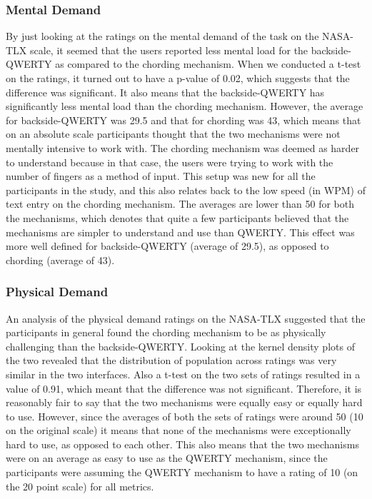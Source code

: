 \subsubsection{Mental Demand}

By just looking at the ratings on the mental demand of the task on the
NASA-TLX scale, it seemed that the users reported less mental load for
the backside-QWERTY as compared to the chording mechanism. When we
conducted a t-test on the ratings, it turned out to have a p-value of
0.02, which suggests that the difference was significant. It also
means that the backside-QWERTY has significantly less mental load than
the chording mechanism. However, the average for backside-QWERTY was
29.5 and that for chording was 43, which means that on an absolute
scale participants thought that the two mechanisms were not mentally
intensive to work with. The chording mechanism was deemed as harder to
understand because in that case, the users were trying to work with
the number of fingers as a method of input. This setup was new for all
the participants in the study, and this also relates back to the low
speed (in WPM) of text entry on the chording mechanism. The averages
are lower than 50 for both the mechanisms, which denotes that quite a
few participants believed that the mechanisms are simpler to
understand and use than QWERTY. This effect was more well defined for
backside-QWERTY (average of 29.5), as opposed to chording (average of
43).

\subsubsection{Physical Demand}

An analysis of the physical demand ratings on the NASA-TLX suggested
that the participants in general found the chording mechanism to be as
physically challenging than the backside-QWERTY. Looking at the kernel
density plots of the two revealed that the distribution of population
across ratings was very similar in the two interfaces. Also a t-test
on the two sets of ratings resulted in a value of 0.91, which meant
that the difference was not significant. Therefore, it is reasonably
fair to say that the two mechanisms were equally easy or equally hard
to use. However, since the averages of both the sets of ratings were
around 50 (10 on the original scale) it means that none of the
mechanisms were exceptionally hard to use, as opposed to each
other. This also means that the two mechanisms were on an average as
easy to use as the QWERTY mechanism, since the participants were
assuming the QWERTY mechanism to have a rating of 10 (on the 20 point
scale) for all metrics.

